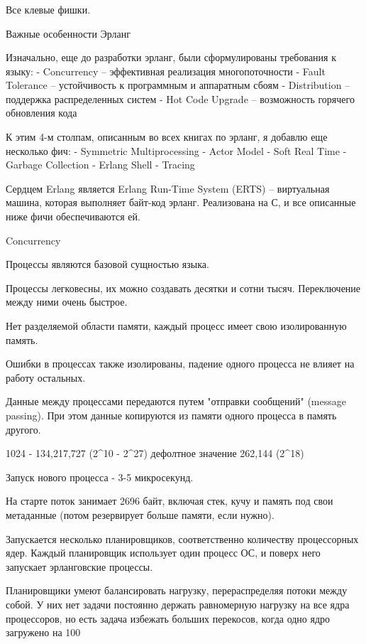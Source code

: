\documentclass[10pt]{beamer}
\begin{document}
\begin{frame}
\frametitle{}
\centering
\par \bigskip
\end{frame}

Все клевые фишки.

Важные особенности Эрланг

Изначально, еще до разработки эрланг, были сформулированы требования к языку:
- Concurrency -- эффективная реализация многопоточности
- Fault Tolerance -- устойчивость к программным и аппаратным сбоям
- Distribution -- поддержка распределенных систем
- Hot Code Upgrade -- возможность горячего обновления кода

К этим 4-м столпам, описанным во всех книгах по эрланг, я добавлю еще несколько фич:
- Symmetric Multiprocessing
- Actor Model
- Soft Real Time
- Garbage Collection
- Erlang Shell
- Tracing

Сердцем Erlang является Erlang Run-Time System (ERTS) -- виртуальная машина, которая выполняет байт-код эрланг.
Реализована на С, и все описанные ниже фичи обеспечиваются ей.


Concurrency

Процессы являются базовой сущностью языка.

Процессы легковесны, их можно создавать десятки и сотни тысяч. Переключение между ними очень быстрое.

Нет разделяемой области памяти, каждый процесс имеет свою изолированную память.

Ошибки в процессах также изолированы, падение одного процесса не влияет на работу остальных.

Данные между процессами передаются путем "отправки сообщений" (message passing).
При этом данные копируются из памяти одного процесса в память другого.

1024 - 134,217,727 (2^10 - 2^27)
дефолтное значение 262,144 (2^18)

Запуск нового процесса - 3-5 микросекунд.

На старте поток занимает 2696 байт, включая стек, кучу и память под свои метаданные
(потом резервирует больше памяти, если нужно).

Запускается несколько планировщиков, соответственно количеству процессорных ядер.
Каждый планировщик использует один процесс ОС, и поверх него запускает эрланговские процессы.

Планировщики умеют балансировать нагрузку, перераспределяя потоки между собой.
У них нет задачи постоянно держать равномерную нагрузку на все ядра процессоров,
но есть задача избежать больших перекосов, когда одно ядро загружено на 100%
\end{document}
